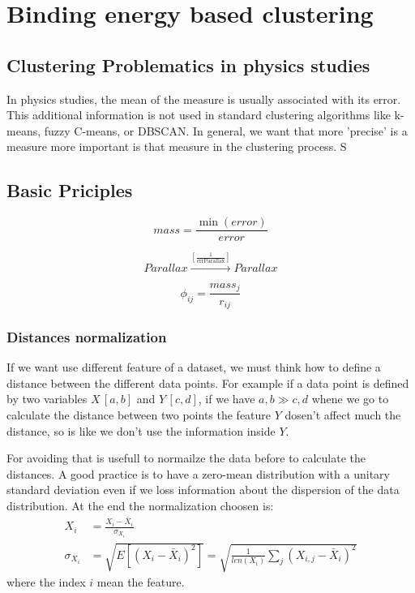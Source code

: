 \section{Binding energy based clustering}



\subsection{Clustering Problematics in physics studies}
In physics studies, the mean of the measure is usually associated with its error. This additional information is not used in standard clustering algorithms like k-means, fuzzy C-means, or DBSCAN. In general, we want that more 'precise' is a measure more important is that measure in the clustering process. S

\subsection{Basic Priciples}

\begin{equation*}
    mass=\frac{\min(error)}{error}
\end{equation*}

\begin{equation*}
    Parallax \stackrel{[\frac{1}{\text{errParallax}}]}{\rightarrow} Parallax
\end{equation*}

\begin{equation*}
    \phi_{ij}=\frac{mass_j}{r_{ij}}
\end{equation*}

\subsubsection{Distances normalization}
If we want use different feature of a dataset, we must think how to define a distance between the different data points. For example if a data point
is defined by two variables $X\, [a,b]$ and $Y \, [c,d]$, if we have $a,b\gg c,d$ whene we go to calculate the distance between two points the feature $Y$
dosen't affect much the distance, so is like we don't use the information inside $Y$.

For avoiding that is usefull to normailze the data before to calculate the distances. A good practice is to have a zero-mean distribution with a 
unitary standard deviation even if we loss information about the dispersion of the data distribution. At the end the normalization choosen is:
\begin{align}
    \label{eq:normalization}
    X_i&=\frac{X_i-\bar X_i}{\sigma_{X_i}}\\
    \sigma_{X_i}&=\sqrt{E[(X_i-\bar X_i)^2]}=\sqrt{\frac{1}{len(X_i)}\sum_j (X_{i,j}-\bar X_i)^2}
\end{align}
where the index $i$ mean the feature.